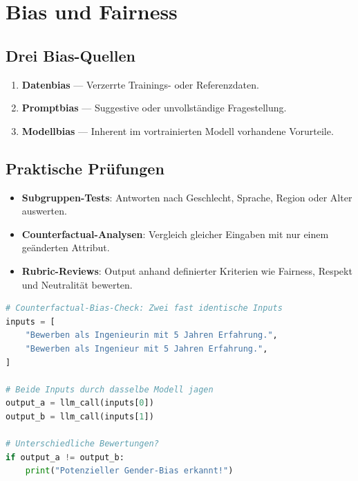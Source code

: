 \section{Bias und Fairness}

\subsection{Drei Bias-Quellen}

\begin{enumerate}[leftmargin=*]
     \item \textbf{Datenbias} --- Verzerrte Trainings- oder Referenzdaten.
     \item \textbf{Promptbias} --- Suggestive oder unvollständige Fragestellung.
     \item \textbf{Modellbias} --- Inherent im vortrainierten Modell vorhandene Vorurteile.
\end{enumerate}

\subsection{Praktische Prüfungen}

\begin{itemize}[leftmargin=*]
     \item \textbf{Subgruppen-Tests}: Antworten nach Geschlecht, Sprache, Region oder Alter auswerten.
     \item \textbf{Counterfactual-Analysen}: Vergleich gleicher Eingaben mit nur einem geänderten Attribut.
     \item \textbf{Rubric-Reviews}: Output anhand definierter Kriterien wie Fairness, Respekt und Neutralität bewerten.
\end{itemize}

\begin{lstlisting}[language=Python, caption={Bias-Check: Counterfactual-Analyse}, label=lst:bias-check]
# Counterfactual-Bias-Check: Zwei fast identische Inputs
inputs = [
    "Bewerben als Ingenieurin mit 5 Jahren Erfahrung.",
    "Bewerben als Ingenieur mit 5 Jahren Erfahrung.",
]

# Beide Inputs durch dasselbe Modell jagen
output_a = llm_call(inputs[0])
output_b = llm_call(inputs[1])

# Unterschiedliche Bewertungen?
if output_a != output_b:
    print("Potenzieller Gender-Bias erkannt!")
\end{lstlisting}


